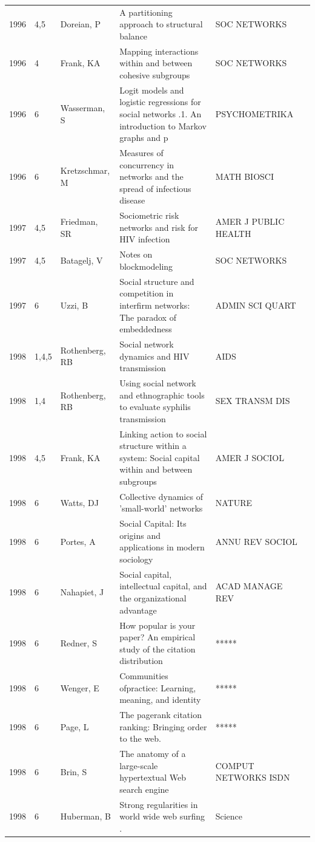 \documentclass[11pt]{article} %
\begin{document}
\begin{longtable}{p{0.8cm}|p{1.25cm}|p{2.8cm}|p{7.5cm}|p{3cm}l}
1996&	4,5&	Doreian, P&	 A partitioning approach to structural balance&         	SOC NETWORKS\\
1996&	4&	Frank, KA&	 Mapping interactions within and between cohesive subgroups&         	SOC NETWORKS\\
1996&	6&	Wasserman, S&	 Logit models and logistic regressions for social networks .1. An introduction to Markov graphs and p&         	PSYCHOMETRIKA\\
1996&	6&	Kretzschmar, M&	 Measures of concurrency in networks and the spread of infectious disease&         	MATH BIOSCI\\
1997&	4,5&	Friedman, SR&	 Sociometric risk networks and risk for HIV infection&         	AMER J PUBLIC HEALTH\\
1997&	4,5&	Batagelj, V&	 Notes on blockmodeling&         	SOC NETWORKS\\
1997&	6&	Uzzi, B&	 Social structure and competition in interfirm networks: The paradox of embeddedness&         	ADMIN SCI QUART\\
1998&	1,4,5&	Rothenberg, RB&	 Social network dynamics and HIV transmission&         	AIDS\\
1998&	1,4&	Rothenberg, RB&	 Using social network and ethnographic tools to evaluate syphilis transmission&         	SEX TRANSM DIS\\
1998&	4,5&	Frank, KA&	 Linking action to social structure within a system: Social capital within and between subgroups&         	AMER J SOCIOL\\
1998&	6&	Watts, DJ&	 Collective dynamics of 'small-world' networks&         	NATURE\\
1998&	6&	Portes, A&	 Social Capital: Its origins and applications in modern sociology&         	ANNU REV SOCIOL\\
1998&	6&	Nahapiet, J&	 Social capital, intellectual capital, and the organizational advantage&         	ACAD MANAGE REV\\
1998&	6&	Redner, S&	 How popular is your paper? An empirical study of the citation distribution&         	*****\\
1998&	6&	Wenger, E&	 Communities ofpractice: Learning, meaning, and identity&         	*****\\
1998&	6&	Page, L &	The pagerank citation ranking: Bringing order to the web.&         	*****\\
1998&	6&	Brin, S&	 The anatomy of a large-scale hypertextual Web search engine&         	COMPUT NETWORKS ISDN\\
1998&	6&	Huberman, B&	Strong regularities in world wide web surfing .&         	Science \\

\end{longtable}
\end{document}
